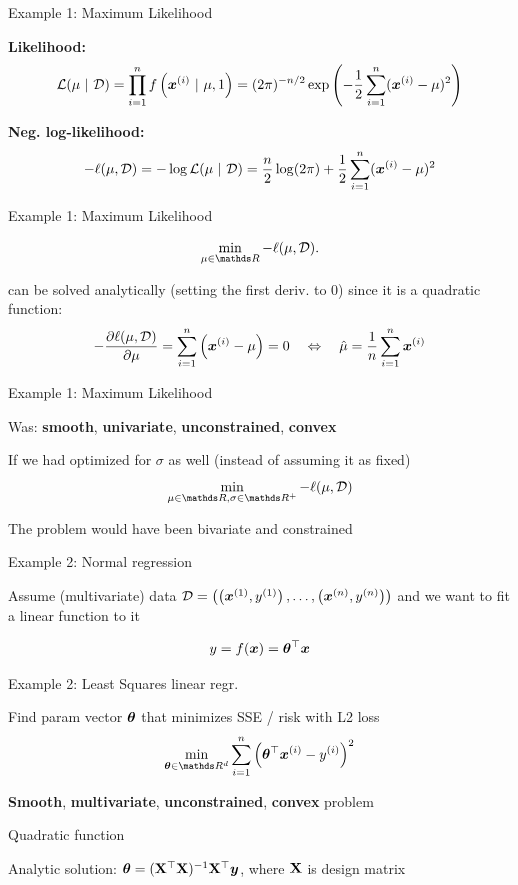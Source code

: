\documentclass[11pt,compress,t,notes=noshow, xcolor=table]{beamer}
\begin{document}
\begin{framei}{Example 1: Maximum Likelihood}
\item \textbf{Likelihood:}
$$ \mathcal{L}(\mu~|~\mathcal{D})= \prod_{i=1}^{n} f\left(\bm{x}^{(i)}~|~\mu, 1\right) = (2\pi)^{-n/2}\exp\left(-\frac{1}{2} \sum_{i=1}^{n} (\bm{x}^{(i)}-\mu)^{2} \right) $$
\item \textbf{Neg. log-likelihood:}
$$ - \ell(\mu, \mathcal{D}) = - \log \mathcal{L}(\mu~|~\mathcal{D}) = \frac{n}{2} \log(2\pi) + \frac{1}{2} \sum_{i=1}^{n} (\bm{x}^{(i)}-\mu)^{2} $$
\end{framei}


\begin{framei}{Example 1: Maximum Likelihood}
\item[] $$ \min_{\mu \in \R} - \ell(\mu, \D). $$
\item can be solved analytically (setting the first deriv. to $0$) since it is a quadratic function:
$$ -\frac{\partial \ell(\mu, \mathcal{D})}{\partial \mu} = \sum\limits_{i=1}^n \left(\bm{x}^{(i)} - \mu\right) = 0 \quad \Leftrightarrow \quad \hat \mu = \frac{1}{n} \sum\limits_{i=1}^n \bm{x}^{(i)} $$
\end{framei}


\begin{framei}[sep=L]{Example 1: Maximum Likelihood}
\item Was: \textbf{smooth}, \textbf{univariate}, \textbf{unconstrained}, \textbf{convex}
\item If we had optimized for $\sigma$ as well (instead of assuming it as fixed)
$$ \min_{\mu \in \R, \sigma \in \R^+} - \ell(\mu, \D) $$
\item The problem would have been bivariate and constrained
\end{framei}


\begin{framei}{Example 2: Normal regression}
\item Assume (multivariate) data $\mathcal{D} = \left( \left(\bm{x}^{(1)}, y^{(1)}\right), \ldots, \left(\bm{x}^{(n)}, y^{(n)}\right)\right)$ and we want to fit a linear function to it
\item[] $$ y = f(\bm{x}) = \bm{\theta}^\top \bm{x} $$
\vfill
{}
\end{framei}


\begin{framei}{Example 2: Least Squares linear regr.}
\item Find param vector $\bm{\theta}$ that minimizes SSE / risk with L2 loss
$$ \min_{\thetav \in \R^d} \sumin \left(\thetav^\top \xi - \yi\right)^2 $$
\vfill
{}
\item \textbf{Smooth}, \textbf{multivariate}, \textbf{unconstrained}, \textbf{convex} problem
\item Quadratic function
\item Analytic solution: $\bm{\theta} = (\mathbf{X}^\top \mathbf{X})^{-1}\mathbf{X}^\top \bm{y}$, where $\mathbf{X}$ is design matrix
\end{framei}
\end{document}
